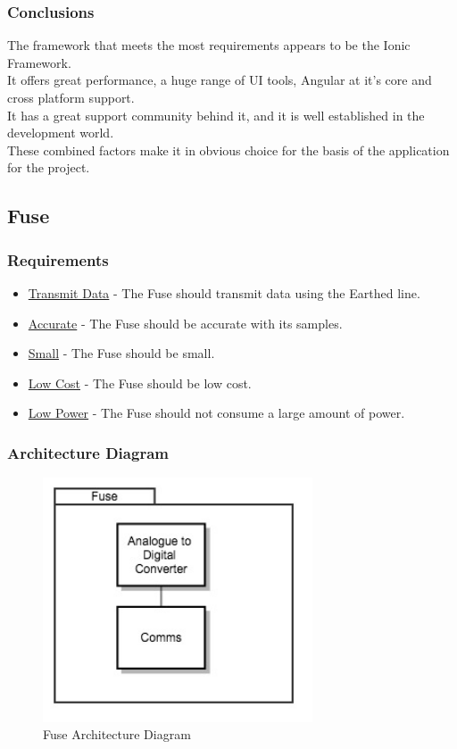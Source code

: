 \documentclass[draft,preprint,12pt,3p]{elsarticle}
\begin{document}
\subsubsection{Conclusions}
The framework that meets the most requirements appears to be the Ionic Framework.\\
It offers great performance, a huge range of UI tools, Angular at it's core and cross platform support.\\
It has a great support community behind it, and it is well established in the development world.\\
These combined factors make it in obvious choice for the basis of the application for the project.
\subsection{Fuse}
\subsubsection{Requirements}
\begin{itemize}
\item \underline{Transmit Data} - The Fuse should transmit data using the Earthed line.
\item \underline{Accurate} - The Fuse should be accurate with its samples.
\item \underline{Small} - The Fuse should be small.
\item \underline{Low Cost} - The Fuse should be low cost.
\item \underline{Low Power} - The Fuse should not consume a large amount of power.
\end{itemize}
\subsubsection{Architecture Diagram}
\begin{figure}[H]
    \centering
    \includegraphics[width=8cm]{diagrams/fuse}
    \caption {Fuse Architecture Diagram}
\end{figure}
\end{document}
